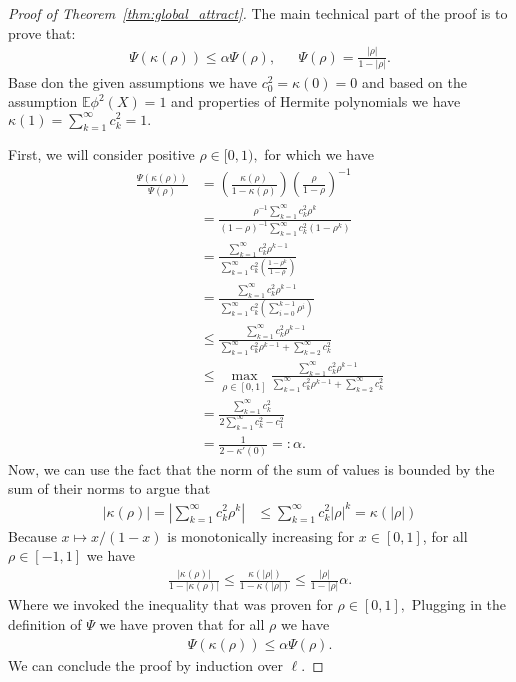 \documentclass[twoside]{article}
\newcommand{\E}{\mathbb{E}}
\theoremstyle{definition}
\begin{document}
\begin{proof}[Proof of Theorem~\ref{thm:global_attract}]
 The main technical part of the proof is to prove that:
    \begin{align*}
        \Psi(\kappa(\rho)) \le \alpha \Psi(\rho), && \Psi(\rho) = \frac{|\rho|}{1-|\rho|}.
    \end{align*}
Base don the given assumptions we have $c_0^2 = \kappa(0) = 0$ and based on the assumption $\E \phi^2(X)=1$ and properties of Hermite polynomials we have $\kappa(1)=\sum_{k=1}^\infty c_k^2 = 1.$ 
    
 First, we will consider positive $\rho\in[0,1),$ for which we have
    \begin{align*}
 \frac{\Psi(\kappa(\rho))}{\Psi(\rho)}&=\left(\frac{\kappa(\rho)}{1-\kappa(\rho)}\right)  \left(\frac{\rho}{1-\rho}\right)^{-1}\\  
        &= \frac{\rho^{-1}\sum_{k=1}^\infty c_k^2 \rho^{k} }{(1-\rho)^{-1}\sum_{k=1}^\infty c_k^2 (1-\rho^{k})} \\
        &= \frac{\sum_{k=1}^\infty c_k^2 \rho^{k-1}}{\sum_{k=1}^\infty c_k^2 \left(\frac{1-\rho^{k}}{1-\rho}\right)}\\
        &= \frac{\sum_{k=1}^\infty c_k^2 \rho^{k-1}}{\sum_{k=1}^\infty c_k^2 \left(\sum_{i=0}^{k-1}\rho^{i}\right)}\\
        &\le \frac{\sum_{k=1}^\infty c_k^2\rho^{k-1} }{\sum_{k=1}^\infty c_k^2 \rho^{k-1} + \sum_{k=2}^\infty c_k^2}\\
        &\le \max_{\rho\in[0,1]} \frac{\sum_{k=1}^\infty c_k^2\rho^{k-1} }{\sum_{k=1}^\infty c_k^2 \rho^{k-1} + \sum_{k=2}^\infty c_k^2}\\
        &= \frac{\sum_{k=1}^\infty c_k^2}{2\sum_{k=1}^\infty c_k^2 -c_1^2 } \\
        &=\frac{1}{2-\kappa'(0)} =: \alpha.
    \end{align*}
 Now, we can use the fact that the norm of the sum of values is bounded by the sum of their norms to argue that
    \begin{align*}
 |\kappa(\rho)|=|\sum_{k=1}^\infty c_k^2 \rho^k | &\le \sum_{k=1}^\infty c_k^2 |\rho|^k 
 = \kappa(|\rho|)
    \end{align*}
 Because $x\mapsto x/(1-x)$ is monotonically increasing for $x\in[0,1]$, for all $\rho\in[-1,1]$ we have 
    \begin{align*}
 \frac{|\kappa(\rho)|}{1-|\kappa(\rho)|}\le \frac{\kappa(|\rho|)}{1-\kappa(|\rho|)} \le \frac{|\rho|}{1-|\rho|}\alpha.
    \end{align*}
Where we invoked the inequality that was proven for $\rho\in[0,1], $ Plugging in the definition of $\Psi$ we have proven that for all $\rho$ we have
\begin{align*}
    \Psi(\kappa(\rho)) \le \alpha \Psi(\rho).
\end{align*}
We can conclude the proof by induction over $\ell.$


\end{proof}
\end{document}
